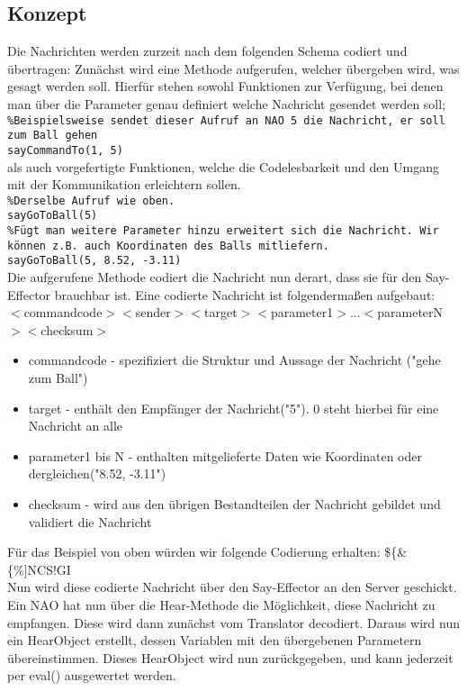 \subsection*{Konzept}
Die Nachrichten werden zurzeit nach dem folgenden Schema codiert und 
übertragen:
Zunächst wird eine Methode aufgerufen, welcher übergeben wird, was 
gesagt werden soll. 
Hierfür stehen sowohl Funktionen zur Verfügung, bei denen man über die 
Parameter genau definiert welche Nachricht gesendet werden soll;\\
\texttt{\%Beispielsweise sendet dieser Aufruf an NAO 5 die Nachricht, er soll zum Ball gehen\\
sayCommandTo(1, 5)}\\
als auch vorgefertigte Funktionen, welche die Codelesbarkeit und den Umgang mit der Kommunikation erleichtern sollen.\\
\texttt{\%Derselbe Aufruf wie oben.\\
sayGoToBall(5)}\\
\texttt{\%Fügt man weitere Parameter hinzu erweitert sich die Nachricht. Wir können z.B. auch Koordinaten des Balls mitliefern.\\
sayGoToBall(5, 8.52, -3.11)}\\
Die aufgerufene Methode codiert die Nachricht nun derart, dass 
sie für den Say-Effector brauchbar ist. Eine codierte Nachricht ist 
folgendermaßen aufgebaut:\\
$<$commandcode$><$sender$><$target$><$parameter1$>$...$<$parameterN$><$checksum$>$

\begin{itemize}
\item  commandcode - spezifiziert die Struktur und Aussage der Nachricht ("gehe zum Ball")
\item  target - enthält den Empfänger der Nachricht("5"). 0 steht hierbei für eine Nachricht an alle
\item  parameter1 bis N - enthalten mitgelieferte Daten wie Koordinaten oder dergleichen("8.52, -3.11")
\item  checksum - wird aus den übrigen Bestandteilen der Nachricht gebildet und validiert die Nachricht
\end{itemize}
Für das Beispiel von oben würden wir folgende Codierung erhalten: \$\{\&\{\%]NCS!GI\\
Nun wird diese codierte Nachricht über den Say-Effector an den Server geschickt.\\
Ein NAO hat nun über die Hear-Methode die Möglichkeit, diese 
Nachricht zu empfangen. Diese wird dann zunächst vom Translator 
decodiert. Daraus wird nun ein HearObject erstellt, dessen Variablen mit
 den übergebenen Parametern übereinstimmen. Dieses HearObject wird nun 
zurückgegeben, und kann jederzeit per eval() ausgewertet werden. 

